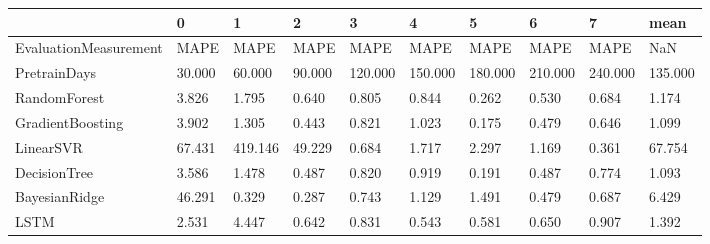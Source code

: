 \begin{tabular}{llllllllll}
\toprule
{} &      0 &       1 &      2 &       3 &       4 &       5 &       6 &       7 &    mean \\
\midrule
EvaluationMeasurement &   MAPE &    MAPE &   MAPE &    MAPE &    MAPE &    MAPE &    MAPE &    MAPE &     NaN \\
PretrainDays          & 30.000 &  60.000 & 90.000 & 120.000 & 150.000 & 180.000 & 210.000 & 240.000 & 135.000 \\
RandomForest          &  3.826 &   1.795 &  0.640 &   0.805 &   0.844 &   0.262 &   0.530 &   0.684 &   1.174 \\
GradientBoosting      &  3.902 &   1.305 &  0.443 &   0.821 &   1.023 &   0.175 &   0.479 &   0.646 &   1.099 \\
LinearSVR             & 67.431 & 419.146 & 49.229 &   0.684 &   1.717 &   2.297 &   1.169 &   0.361 &  67.754 \\
DecisionTree          &  3.586 &   1.478 &  0.487 &   0.820 &   0.919 &   0.191 &   0.487 &   0.774 &   1.093 \\
BayesianRidge         & 46.291 &   0.329 &  0.287 &   0.743 &   1.129 &   1.491 &   0.479 &   0.687 &   6.429 \\
LSTM                  &  2.531 &   4.447 &  0.642 &   0.831 &   0.543 &   0.581 &   0.650 &   0.907 &   1.392 \\
\bottomrule
\end{tabular}
